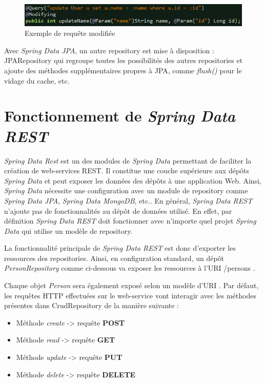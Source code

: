 \documentclass{polytech/polytech}
\begin{document}
\begin{figure}
	\includegraphics[scale=0.85]{images/queryModifying}
	\caption{Exemple de requête modifiée}
	\label{fig:queryModifying}
\end{figure}

Avec \textit{Spring Data JPA}, un autre repository est mise à disposition : JPARepository qui regroupe toutes les possibilités des autres repositories et ajoute des méthodes supplémentaires propres à JPA, comme \textit{flush()} pour le vidage du cache, etc.

\section{Fonctionnement de \textit{Spring Data REST}}

\textit{Spring Data Rest} est un des modules de \textit{Spring Data} permettant de faciliter la création de web-services REST. Il constitue une couche supérieure aux dépôts \textit{Spring Data} et peut exposer les données des dépôts à une application Web. Ainsi, \textit{Spring Data} nécessite une configuration avec un module de repository comme \textit{Spring Data JPA}, \textit{Spring Data MongoDB}, etc.. En général, \textit{Spring Data REST} n’ajoute pas de fonctionnalités au dépôt de données utilisé. En effet, par définition \textit{Spring Data REST} doit fonctionner avec n’importe quel projet \textit{Spring Data} qui utilise un modèle de repository.

La fonctionnalité principale de \textit{Spring Data REST} est donc d’exporter les ressources des repositories. Ainsi, en configuration standard, un dépôt \textit{PersonRepository} comme ci-dessous va exposer les ressources à l’URI /persons .


Chaque objet \textit{Person} sera également exposé selon un modèle d’URI . Par défaut, les requêtes HTTP effectuées sur le web-service vont interagir avec les méthodes présentes dans CrudRepository de la manière suivante : 

\begin{itemize}
	\item Méthode \textit{create} -> requête \textbf{POST}
	\item Méthode \textit{read} -> requête \textbf{GET}
	\item Méthode \textit{update} -> requête \textbf{PUT}
	\item Méthode \textit{delete} -> requête \textbf{DELETE}
\end{itemize}
\end{document}
